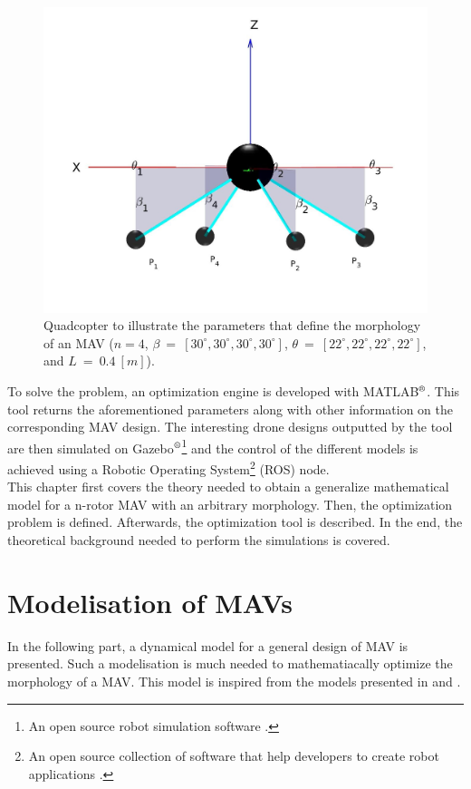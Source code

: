\begin{figure}[h]
\begin{minipage}[t]{0.3\textwidth}
  \centering
  \includegraphics[width=\textwidth]{images/drone_design2.jpg}
\end{minipage}
\caption{Quadcopter to illustrate the parameters that define the morphology of an
MAV ($n = 4$, $\beta\ =\ [30^{\circ}, 30^{\circ}, 30^{\circ}, 30^{\circ}]$,
$\theta\ =\ [22^{\circ}, 22^{\circ}, 22^{\circ}, 22^{\circ}]$, and $L\ =\ 0.4\ [m]$).}
\label{fig:drone_design}
\end{figure}

To solve the problem, an optimization engine is developed with
MATLAB$^\textrm{\textregistered}$. This tool returns the aforementioned
parameters along with other information on the corresponding MAV design.
The interesting drone designs outputted by the tool are then simulated on
Gazebo$^\textrm{\textregistered}$\footnote{An open source robot simulation software \citep{noauthor_gazebo_nodate}.}
and the control of the different models is achieved using a Robotic Operating
System\footnote{An open source collection of software that help developers to
create robot applications \citep{rostutorials}.} (ROS) node.\\
This chapter first covers the theory needed to obtain a generalize mathematical
model for a n-rotor MAV with an arbitrary morphology. Then, the optimization
problem is defined. Afterwards, the optimization tool is described. In the end,
the theoretical background needed to perform the simulations is covered.

\section{Modelisation of MAVs}
\label{sec:modeling_mav}
In the following part, a dynamical model for a general design of MAV is presented.
Such a modelisation is much needed to mathematiacally optimize the morphology of
a MAV. This model is inspired from the models presented in
\citep{kamel_voliro:_2018} and \citep{ryll_modeling_2012}.

